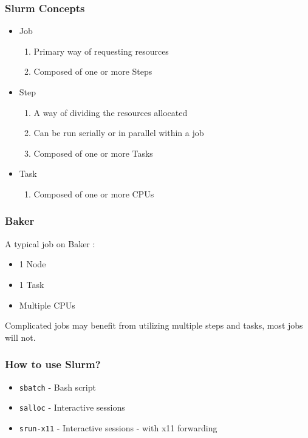 \documentclass{beamer}
\newcommand{\code}[1]{\colorbox{codegray}{\texttt{#1}}}
\begin{document}
\begin{frame}
\frametitle{Slurm Concepts}
\begin{itemize}
    \item Job
    \pause 
    \begin{enumerate}
        \item Primary way of requesting resources
        \pause
        \item Composed of one or more Steps
    \end{enumerate}
    \bigskip
    \pause
    \item Step
    \begin{enumerate}
        \item A way of dividing the resources allocated
        \pause
        \item Can be run serially or in parallel within a job
        \pause
        \item Composed of one or more Tasks
    \end{enumerate}
    \bigskip
    \pause
    \item Task
    \begin{enumerate}
        \item Composed of one or more CPUs
    \end{enumerate}
    \bigskip
\end{itemize}
\end{frame}



\begin{frame}
\frametitle{Baker}
A typical job on Baker : 
\bigskip
\begin{itemize}
    \item 1 Node 
    \pause 
    \bigskip
    \pause
    \item 1 Task
    \bigskip
    \pause
    \item Multiple CPUs
    \bigskip
    \pause
\end{itemize}
Complicated jobs may benefit from utilizing multiple steps and tasks, most jobs will not.
\end{frame}



\begin{frame}
\frametitle{How to use Slurm?}
\begin{itemize}
    \item \code{sbatch} - Bash script
    \bigskip
    \pause
    \item \code{salloc} - Interactive sessions
    \bigskip
    \pause
    \item \code{srun-x11} - Interactive sessions - with x11 forwarding
    \bigskip
\end{itemize}
\end{frame}
\end{document}
